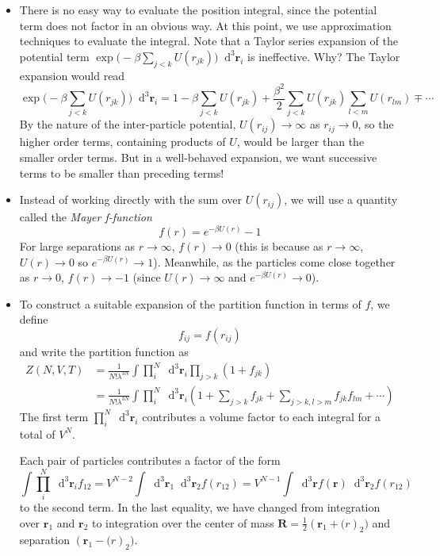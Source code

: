 \documentclass[11pt, a4paper]{article}
\newcommand{\diff}{\mathop{}\!\mathrm{d}} %
\begin{document}
\begin{itemize}
	\item There is no easy way to evaluate the position integral, since the potential term does not factor in an obvious way. At this point, we use approximation techniques to evaluate the integral. Note that a Taylor series expansion of the potential term $ \exp \big (-\beta \sum_{j < k}U(r_{jk})\big ) \diff^{3} \bm{r}_{i}  $ is ineffective. Why? The Taylor expansion would read
	\begin{equation*}
		\exp \bigg (-\beta \sum_{j < k}U(r_{jk})\bigg ) \diff^{3} \bm{r}_{i} = 1 -\beta \sum_{j < k}U(r_{jk}) + \frac{\beta^{2}}{2} \sum_{j < k}U(r_{jk}) \sum_{l < m}U(r_{lm}) \mp \cdots
	\end{equation*}
	By the nature of the inter-particle potential, $ U(r_{ij}) \to \infty $ as $ r_{ij} \to 0 $, so the higher order terms, containing products of $ U $, would be larger than the smaller order terms. But in a well-behaved expansion, we want successive terms to be smaller than preceding terms! 
	
	\item Instead of working directly with the sum over $ U(r_{ij}) $, we will use a quantity called the \textit{Mayer f-function}
	\begin{equation*}
		f(r) = e^{-\beta U(r)} -1
	\end{equation*}
	For large separations as $ r \to \infty $, $ f(r) \to 0$ (this is because as $ r \to \infty $, $ U(r) \to 0 $ so $ e^{-\beta U(r)} \to 1$). Meanwhile, as the particles come close together as $ r \to 0 $, $ f(r) \to -1 $ (since $ U(r) \to \infty$ and $ e^{-\beta U(r)} \to 0 $). 
	
	\item To construct a suitable expansion of the partition function in terms of $ f $, we define
	\begin{equation*}
		f_{ij} = f(r_{ij})
	\end{equation*}
	and write the partition function as
	\begin{align*}
		Z(N, V, T) &= \frac{1}{N! \lambda^{3N}} \int \prod_{i}^{N}\diff^{3}\bm{r}_{i} \prod_{j > k}(1 + f_{jk})\\
		&=\frac{1}{N! \lambda^{3N}} \int \prod_{i}^{N}\diff^{3}\bm{r}_{i}\left(1 + \sum_{j>k}f_{jk} + \sum_{j > k, l>m}f_{jk}f_{lm} + \cdots\right)
	\end{align*}
	The first term $  \prod_{i}^{N}\diff^{3}\bm{r}_{i} $ contributes a volume factor to each integral for a total of $ V^{N} $. 
	
	Each pair of particles contributes a factor of the form
	\begin{equation*}
		\int \prod_{i}^{N} \diff^{3}\bm{r}_{i} f_{12} = V^{N-2}\int \diff^{3}\bm{r}_{1} \diff^{3}\bm{r}_{2}f(r_{12}) = V^{N-1}\int \diff^{3}\bm{r} f(\bm{r}) \diff^{3}\bm{r}_{2}f(r_{12})
	\end{equation*}
	to the second term. In the last equality, we have changed from integration over $ \bm{r}_{1} $ and $ \bm{r}_{2} $ to integration over the center of mass $ \bm{R} = \tfrac{1}{2}(\bm{r}_{1} + \bm(r)_{2}) $ and separation $ (\bm{r}_{1} - \bm(r)_{2}) $.
	

\end{itemize}
\end{document}
